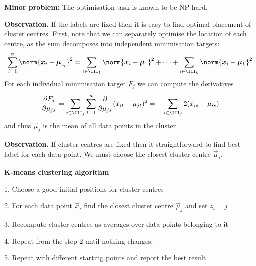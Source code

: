 \documentclass[landscape,footrule]{foils}
\begin{document}
\textbf{Minor problem:} The optimisation task is known to be NP-hard.



\textbf{Observation.} If the labels are fixed then it is easy to find optimal placement of cluster centres. First, note that we can separately optimise the location of each centre, as the sum decomposes into independent minimisation targets:  
\begin{align*}
\sum_{i=1}^n\norm{\vec{x}_i-\vec{\mu}_{z_i}}^2=\sum_{i\in\III_1}\norm{\vec{x}_i-\vec{\mu}_{1}}^2+\cdots+\sum_{i\in\III_k}\norm{\vec{x}_i-\vec{\mu}_{k}}^2
\end{align*}
For each individual minimisation target $F_j$ we can compute the derivatives
\begin{align*}
\frac{\partial F_j}{\partial \mu_{js}}=\sum_{i\in\III_j}\sum_{t=1}^d\frac{\partial}{\partial \mu_{js}}(x_{it}-\mu_{jt})^2=
-\sum_{i\in\III_j}2(x_{is}-\mu_{is})
\end{align*}
and thus $\vec{\mu}_j$ is the mean of all data points in the cluster  



\textbf{Observation.} If cluster centres are fixed then it straightforward to find best label for each data point. We must choose the closest cluster centre $\vec{\mu}_j$.
\vspace*{2cm}


\textbf{K-means clustering algorithm}
\begin{triangles}
\item[1.] Choose a good initial positions for cluster centres
\item[2.] For each data point $\vec{x}_i$ find the closest cluster centre $\vec{\mu}_j$ and set $z_i=j$
\item[3.] Recompute cluster centres as averages over data points belonging to it
\item[4.] Repeat from the step 2 until nothing changes.
\item[5.] Repeat with different starting points and report the best result   
\end{triangles}

\end{document}
